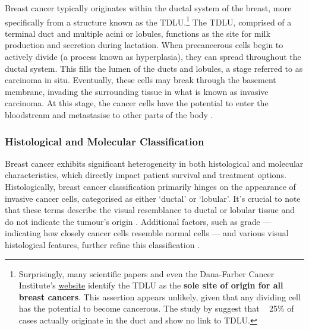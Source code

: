 Breast cancer typically originates within the ductal system of the breast, more specifically from a structure known as the \ac{TDLU}.\footnote{Surprisingly, many scientific papers and even the Dana-Farber Cancer Institute's \href{https://www.dana-farber.org/health-library/articles/what-is-lobular-breast-cancer-}{website} identify the \ac{TDLU} as the  \textbf{sole site of origin for all breast cancers}. This assertion appears unlikely, given that any dividing cell has the potential to become cancerous. The study by \textcite{Tabar2014-ea} suggest that ~ 25\% of cases actually originate in the duct and show no link to \ac{TDLU}.} The \ac{TDLU}, comprised of a terminal duct and multiple acini or lobules, functions as the site for milk production and secretion during lactation. When precancerous cells begin to actively divide (a process known as hyperplasia), they can spread throughout the ductal system. This fills the lumen of the ducts and lobules, a stage referred to as carcinoma in situ. Eventually, these cells may break through the basement membrane, invading the surrounding tissue in what is known as invasive carcinoma. At this stage, the cancer cells have the potential to enter the bloodstream and metastasise to other parts of the body .

\subsubsection{Histological and Molecular Classification}
Breast cancer exhibits significant heterogeneity in both histological and molecular characteristics, which directly impact patient survival and treatment options. Histologically, breast cancer classification primarily hinges on the appearance of invasive cancer cells, categorised as either `ductal' or  `lobular'. It's crucial to note that these terms describe the visual resemblance to ductal or lobular tissue and do not indicate the tumour's origin  \parencite{Tabar2022-iq}. Additional factors, such as grade — indicating how closely cancer cells resemble normal cells — and various visual histological features, further refine this classification \parencite{Elston1991-md}.

